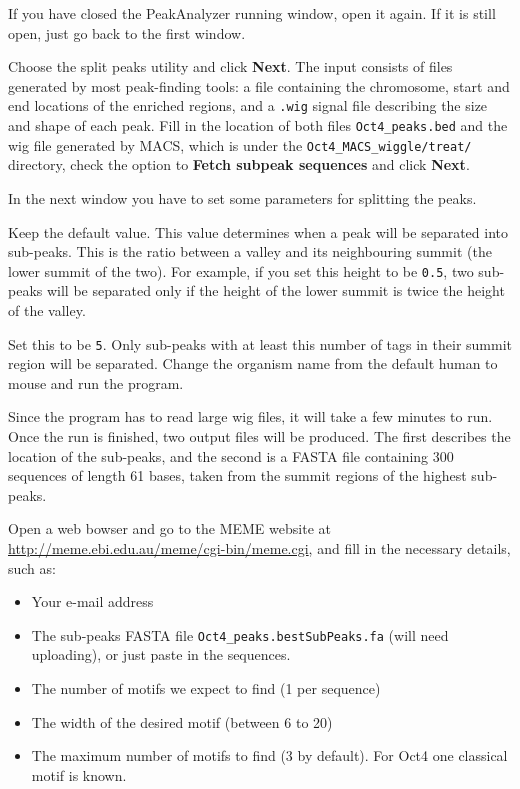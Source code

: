 \begin{steps}
If you have closed the PeakAnalyzer running window, open it again. If it is
still open, just go back to the first window.

Choose the split peaks utility and click \textbf{Next}. The input consists of
files generated by most peak-finding tools: a file containing the chromosome,
start and end locations of the enriched regions, and a \texttt{.wig} signal file
describing the size and shape of each peak. Fill in the location of both files
\texttt{Oct4\_peaks.bed} and the wig file generated by MACS, which is under the
\texttt{Oct4\_MACS\_wiggle/treat/} directory, check the option to \textbf{Fetch subpeak
sequences} and click \textbf{Next}.

In the next window you have to set some parameters for splitting the peaks.

\begin{description}[style=multiline,labelindent=0cm,align=right,leftmargin=\descriptionlabelspace,rightmargin=1.5cm,font=\ttfamily]
 \item[Separation float] Keep the default value. This value determines when a
 peak will be separated into sub-peaks. This is the ratio between a valley and
 its neighbouring summit (the lower summit of the two). For example, if you set
 this height to be \texttt{0.5}, two sub-peaks will be separated only if the
 height of the lower summit is twice the height of the valley.
 \item[Minimum height] Set this to be \texttt{5}. Only sub-peaks with at least this
 number of tags in their summit region will be separated. Change the organism
 name from the default human to mouse and run the program.
\end{description}
\end{steps}

\begin{information}
Since the program has to read large wig files, it will take a few minutes to
run. Once the run is finished, two output files will be produced. The first
describes the location of the sub-peaks, and the second is a FASTA file
containing 300 sequences of length 61 bases, taken from the summit regions of
the highest sub-peaks.
\end{information}

\begin{steps}
Open a web bowser and go to the MEME website at
\url{http://meme.ebi.edu.au/meme/cgi-bin/meme.cgi}, and fill in the necessary
details, such as:
\begin{itemize}
	\item Your e-mail address 
	\item The sub-peaks FASTA file \texttt{Oct4\_peaks.bestSubPeaks.fa} (will need uploading), or just paste in the sequences. 
	\item The number of motifs we expect to find (1 per sequence) 
	\item The width of the desired motif (between 6 to 20) 
	\item The maximum number of motifs to find (3 by default). For Oct4 one classical motif is known. 
\end{itemize}
\end{steps}

